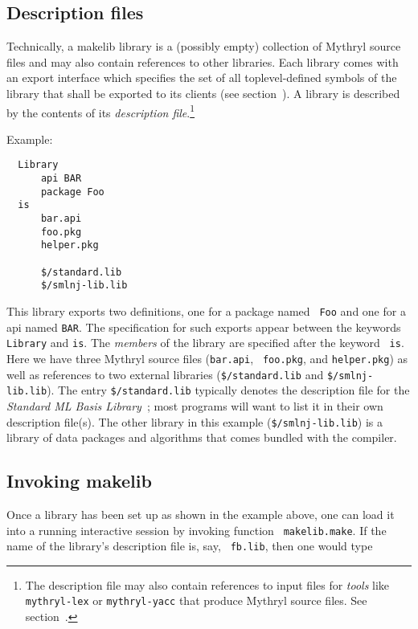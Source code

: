 \subsection{Description files}

Technically, a makelib library is a (possibly empty) collection of Mythryl
source files and may also contain references to other libraries.  Each
library comes with an export interface which specifies the set of all
toplevel-defined symbols of the library that shall be exported to its
clients (see section~).  A library is
described by the contents of its {\em description file}.\footnote{The
description file may also contain references to input files for {\em
tools} like {\tt mythryl-lex} or {\tt mythryl-yacc} that produce Mythryl source
files.  See section~.}

\noindent Example:

\begin{verbatim}
  Library
      api BAR
      package Foo
  is
      bar.api
      foo.pkg
      helper.pkg

      $/standard.lib
      $/smlnj-lib.lib
\end{verbatim}

This library exports two definitions, one for a package named {\tt
Foo} and one for a api named {\tt BAR}.  The specification for
such exports appear between the keywords {\tt Library} and {\tt is}.
The {\em members} of the library are specified after the keyword {\tt
is}.  Here we have three Mythryl source files ({\tt bar.api}, {\tt
foo.pkg}, and {\tt helper.pkg}) as well as references to two external
libraries ({\tt \$/standard.lib} and {\tt \$/smlnj-lib.lib}).  The entry
{\tt \$/standard.lib} typically denotes the description file for the {\it
Standard ML Basis Library}~\cite{reppy99:basis}; most programs will
want to list it in their own description file(s).  The other library
in this example ({\tt \$/smlnj-lib.lib}) is a library of data
packages and algorithms that comes bundled with the compiler.

\subsection{Invoking makelib}

Once a library has been set up as shown in the example above, one can
load it into a running interactive session by invoking function {\tt
makelib.make}.  If the name of the library's description file is, say, {\tt
fb.lib}, then one would type

